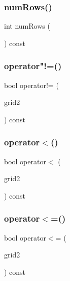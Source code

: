 \mbox{\label{classGrid_a00b7e69dd5c43e42cc91db26c459ad8b}} 
\subsubsection{\texorpdfstring{num\+Rows()}{numRows()}}
{\footnotesize\ttfamily int num\+Rows (\begin{DoxyParamCaption}{ }\end{DoxyParamCaption}) const}

\mbox{\label{classGrid_a9426f59b6352933578b4294bc9d221bc}} 
\subsubsection{\texorpdfstring{operator"!=()}{operator!=()}}
{\footnotesize\ttfamily bool operator!= (\begin{DoxyParamCaption}\item[{const \mbox{\hyperlink{classGrid}{Grid}}$<$ Value\+Type $>$ \&}]{grid2 }\end{DoxyParamCaption}) const}

\mbox{\label{classGrid_aefee1b5c152f0cf1b9537b2542f0fccd}} 
\subsubsection{\texorpdfstring{operator$<$()}{operator<()}}
{\footnotesize\ttfamily bool operator$<$ (\begin{DoxyParamCaption}\item[{const \mbox{\hyperlink{classGrid}{Grid}}$<$ Value\+Type $>$ \&}]{grid2 }\end{DoxyParamCaption}) const}

\mbox{\label{classGrid_adc972513ba66ac1e3e5847abe6e8666c}} 
\subsubsection{\texorpdfstring{operator$<$=()}{operator<=()}}
{\footnotesize\ttfamily bool operator$<$= (\begin{DoxyParamCaption}\item[{const \mbox{\hyperlink{classGrid}{Grid}}$<$ Value\+Type $>$ \&}]{grid2 }\end{DoxyParamCaption}) const}

